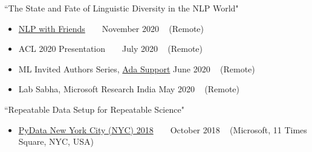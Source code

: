 \begin{talks}

     \talk
	{``The State and Fate of Linguistic Diversity in the NLP World"}
	{
	\begin{itemize}[leftmargin=.4in]
	    \item \href{https://nlpwithfriends.com/}{NLP with Friends} ~
	        \lbrack\href{https://nlpwithfriends.com/speakers/pratik-sebastin}{\small{\websiteSymbol}}\rbrack ~
	        \lbrack\href{https://www.youtube.com/watch?v=UJwJd0mJ1SQ}{\small{\videoSymbol}}\rbrack 
	        \hfill November 2020 ~ (Remote)
	    \item ACL 2020 Presentation ~
	        \lbrack\href{https://virtual.acl2020.org/paper_main.560.html}{\small{\websiteSymbol}}\rbrack ~
	        \lbrack\href{https://slideslive.com/38929069/the-state-and-fate-of-linguistic-diversity-in-the-nlp-world}{\small{\videoSymbol}}\rbrack 
	        \hfill July 2020 ~ (Remote)
	    \item ML Invited Authors Series, \href{https://www.ada.support/}{Ada Support} 
	        \hfill June 2020 ~ (Remote)
	    \item Lab Sabha, Microsoft Research India 
	        \hfill May 2020 ~ (Remote)
	\end{itemize}
	}
	
	\talk
	{``Repeatable Data Setup for Repeatable Science"}
	{
	\begin{itemize}[leftmargin=.4in]
	    \item \href{https://nlpwithfriends.com/}{PyData New York City (NYC) 2018} ~ \lbrack\href{https://pydata.org/nyc2018/schedule/presentation/14/}{\small{\websiteSymbol}}\rbrack ~
	    \lbrack\href{https://www.youtube.com/watch?v=eMtuzjn_Xks}{\small{\videoSymbol}}\rbrack
	    \hfill October 2018 ~ (Microsoft, 11 Times Square, NYC, USA)
	\end{itemize}
	}
\end{talks}    
\vspace{-3mm}

